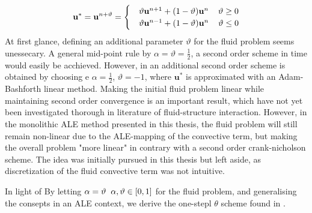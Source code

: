 \begin{align*}
\mathbf{u}^{*} =   \mathbf{u}^{n+ \vartheta} =
\begin{cases} 
   &\vartheta \mathbf{u}^{n+1} + (1 - \vartheta)\mathbf{u}^{n} \hspace{4mm} \vartheta \geq 0 \\ 
   &\vartheta \mathbf{u}^{n-1} + (1 - \vartheta)\mathbf{u}^{n} \hspace{4mm} \vartheta \leq 0
   \end{cases}
\end{align*}
At first glance, defining an additional parameter $\vartheta$ for the fluid problem seems unessecary. A general mid-point rule by  $\alpha = \vartheta = \frac{1}{2}$, a second order scheme in time would easily be acchieved. However, in \cite{Simo1994} an additional second order scheme is obtained by choosing e $\alpha = \frac{1}{2}$,  $\vartheta =-1$, where  $\mathbf{u}^{*}$ is approximated with an Adam-Bashforth linear method. Making the initial fluid problem linear while maintaining second order convergence is an important result, which have not yet been investigated thorough in literature of fluid-structure interaction.  However, in the monolithic  ALE method presented in this thesis, the fluid problem will still remain non-linear due to the ALE-mapping of the convective term, but making the overall problem "more linear" in contrary with a second order crank-nicholson scheme. The idea was initially pursued in this thesis but left aside, as discretization of the fluid convective term was not intuitive. 



In light of By letting $\alpha = \vartheta \hspace{2mm} \alpha, \vartheta \in [0, 1] $ for the fluid problem, and generalising the consepts in an ALE context, we derive the one-stepl $\theta$ scheme found in \cite{Wicka}.

